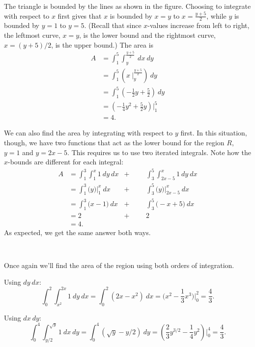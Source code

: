 {The triangle is bounded by the lines as shown in the figure. Choosing to integrate with respect to $x$ first gives that $x$ is bounded by $x=y$ to $x = \frac{y+5}2$, while $y$ is bounded by $y=1$ to $y=5$. (Recall that since $x$-values increase from left to right, the leftmost curve, $x=y$, is the lower bound and the rightmost curve, $x=(y+5)/2$, is the upper bound.) The area is
\begin{align*}
A &= \int_1^5\int_{y}^{\frac{y+5}2}\ dx\ dy \\
 &= \int_1^5\left(x\ \Big|_y^{\frac{y+5}2}\right)\ dy \\
&= \int_1^5 \left(-\frac12y+\frac52\right)\ dy \\
&= \left(-\frac14y^2+\frac52y\right)\Big|_1^5\\
&=4.
\end{align*}

We can also find the area by integrating with respect to $y$ first. In this situation, though, we have two functions that act as the lower bound for the region $R$, $y=1$ and $y=2x-5$. This requires us to use two iterated integrals. Note how the $x$-bounds are different for each integral:
\begin{align*}
A &= \int_1^3\int_1^x 1\ dy \ dx &+& & &\int_3^5\int_{2x-5}^x1\ dy\ dx\\
	&= \int_1^3\big(y\big)\Big|_1^x\ dx & + & & & \int_3^5\big(y\big)\Big|_{2x-5}^x\ dx\\
	&= \int_1^3\big(x-1\big)\ dx & + & & & \int_3^5\big(-x+5\big)\ dx \\
	&= 2 & + & & & 2 \\
	&=4.
\end{align*}
As expected, we get the same answer both ways.
}\\

{Once again we'll find the area of the region using both orders of integration. 

Using $dy\ dx$:
$$\int_0^2\int_{x^2}^{2x}1\ dy \ dx = \int_0^2(2x-x^2)\ dx = \big(x^2-\frac13x^3\big)\Big|_0^2 = \frac43.$$

Using $dx\ dy$:
$$\int_0^4\int_{y/2}^{\sqrt{y}} 1\ dx\ dy = \int_0^4 (\sqrt{y}-y/2)\ dy = \left(\frac23y^{3/2} - \frac14y^2\right)\Big|_0^4 = \frac43.$$
\baselineskip
}\\

